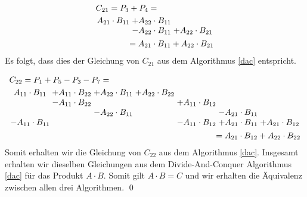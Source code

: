 \begin{bew}
    \begin{equation*}
        \begin{multlined}
            C_{21} = P_{3} + P_{4} = \\
            \arraycolsep=1.4pt
            \begin{array}{ccc}
                A_{21} \cdot B_{11} & + A_{22} \cdot B_{11} &  \\
                & - A_{22} \cdot B_{11} & + A_{22} \cdot B_{21} \\
            \end{array} \\
            = A_{21} \cdot B_{11} + A_{22} \cdot B_{21}
        \end{multlined}
    \end{equation*}
    Es folgt, dass dies der Gleichung von $C_{21}$ aus dem Algorithmus \ref{dac} entspricht.
    
    \begin{equation*}
        \begin{multlined}
            C_{22} = P_{1} + P_{5} - P_{3} - P_{7} = \\
            \arraycolsep=1.4pt
            \begin{array}{ccccccc}
                A_{11} \cdot B_{11} & + A_{11} \cdot B_{22} & + A_{22} \cdot B_{11} & + A_{22} \cdot B_{22} &&& \\
                & - A_{11} \cdot B_{22} &&& + A_{11} \cdot B_{12}&& \\
                && - A_{22} \cdot B_{11} &&& - A_{21} \cdot B_{11}& \\
                - A_{11} \cdot B_{11} &&&& - A_{11} \cdot B_{12} & + A_{21} \cdot B_{11} & + A_{21} \cdot B_{12} \\
            \end{array} \\
            = A_{21} \cdot B_{12} + A_{22} \cdot B_{22}
        \end{multlined}
    \end{equation*}
    Somit erhalten wir die Gleichung von $C_{22}$ aus dem Algorithmus \ref{dac}. Insgesamt erhalten wir dieselben Gleichungen aus dem Divide-And-Conquer Algorithmus \ref{dac} für das Produkt $A \cdot B$. Somit gilt $A \cdot B = C$ und wir erhalten die Äquivalenz zwischen allen drei Algorithmen. \qed
\end{bew}

